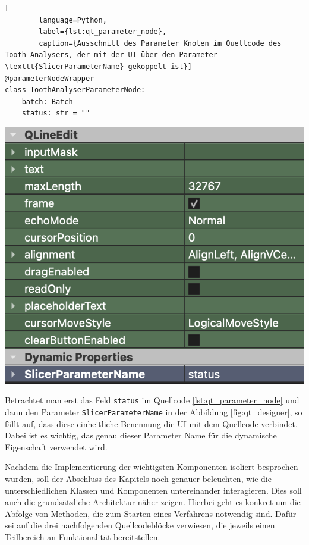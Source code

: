 \begin{minipage}{0.55\textwidth}
	\centering
	\begin{lstlisting}[
		language=Python,
		label={lst:qt_parameter_node},
		caption={Ausschnitt des Parameter Knoten im Quellcode des Tooth Analysers, der mit der UI über den Parameter \texttt{SlicerParameterName} gekoppelt ist}]
@parameterNodeWrapper
class ToothAnalyserParameterNode:
    batch: Batch
    status: str = ""
    \end{lstlisting}
\end{minipage}
\hfill
\begin{minipage}{0.35\textwidth}
	\centering
	\includegraphics[width=\textwidth]{img/qt_designer.png}
	 \label{fig:qt_designer}
\end{minipage}

Betrachtet man erst das Feld \texttt{status} im Quellcode
\ref{lst:qt_parameter_node} und dann den Parameter \texttt{SlicerParameterName} in
der Abbildung \ref{fig:qt_designer}, so fällt auf, dass diese einheitliche Benennung
die \ac{UI} mit dem Quellcode verbindet. Dabei ist es wichtig, das genau dieser
Parameter Name für die dynamische Eigenschaft verwendet wird.

Nachdem die Implementierung der wichtigsten Komponenten isoliert besprochen
wurden, soll der Abschluss des Kapitels noch genauer beleuchten, wie die
unterschiedlichen Klassen und Komponenten untereinander interagieren. Dies soll auch
die grundsätzliche Architektur näher zeigen. Hierbei geht es konkret um die
Abfolge von Methoden, die zum Starten eines Verfahrens notwendig sind. Dafür sei
auf die drei nachfolgenden Quellcodeblöcke verwiesen, die jeweils einen Teilbereich
an Funktionalität bereitstellen.

